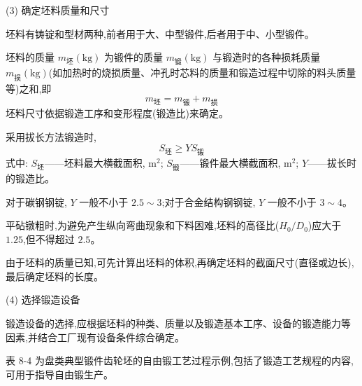 \documentclass[UTF8]{ctexbook}
\newcommand{\◎}{\ensuremath{\bigcirc}}
\begin{document}
(3) 确定坯料质量和尺寸

坯料有铸锭和型材两种,前者用于大、中型锻件,后者用于中、小型锻件。

坯料的质量 $m_{\text{坯}}(\mathrm{kg})$ 为锻件的质量 $m_{\text{锻}}(\mathrm{kg})$ 与锻造时的各种损耗质量 $m_{\text{损}}(\mathrm{kg})$(如加热时的烧损质量、冲孔时芯料的质量和锻造过程中切除的料头质量等)之和,即
\[
m_{\text{坯}} = m_{\text{锻}} + m_{\text{损}}
\]
坯料尺寸依据锻造工序和变形程度(锻造比)来确定。

采用拔长方法锻造时,
\[
S_{\text{坯}} \geqslant Y S_{\text{锻}}
\]
式中: $S_{\text{坯}}$——坯料最大横截面积, $\mathrm{m}^2$; $S_{\text{锻}}$——锻件最大横截面积, $\mathrm{m}^2$; $Y$——拔长时的锻造比。

对于碳钢钢锭, $Y$ 一般不小于 $2.5 \sim 3$;对于合金结构钢钢锭, $Y$ 一般不小于 $3 \sim 4$。

平砧镦粗时,为避免产生纵向弯曲现象和下料困难,坯料的高径比($H_0/D_0$)应大于 $1.25$,但不得超过 $2.5$。

由于坯料的质量已知,可先计算出坯料的体积,再确定坯料的截面尺寸(直径或边长),最后确定坯料的长度。

(4) 选择锻造设备

锻造设备的选择,应根据坯料的种类、质量以及锻造基本工序、设备的锻造能力等因素,并结合工厂现有设备条件综合确定。

表 8-4 为盘类典型锻件齿轮坯的自由锻工艺过程示例,包括了锻造工艺规程的内容,可用于指导自由锻生产。
\end{document}
